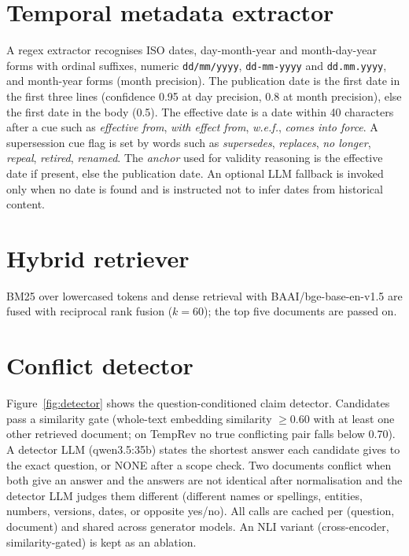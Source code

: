 \documentclass[11pt,a4paper]{report}
\begin{document}
\section{Temporal metadata extractor}
A regex extractor recognises ISO dates, day-month-year and month-day-year forms with ordinal suffixes, numeric \texttt{dd/mm/yyyy}, \texttt{dd-mm-yyyy} and \texttt{dd.mm.yyyy}, and month-year forms (month precision). The publication date is the first date in the first three lines (confidence 0.95 at day precision, 0.8 at month precision), else the first date in the body (0.5). The effective date is a date within 40 characters after a cue such as \emph{effective from}, \emph{with effect from}, \emph{w.e.f.}, \emph{comes into force}. A supersession cue flag is set by words such as \emph{supersedes}, \emph{replaces}, \emph{no longer}, \emph{repeal}, \emph{retired}, \emph{renamed}. The \emph{anchor} used for validity reasoning is the effective date if present, else the publication date. An optional LLM fallback is invoked only when no date is found and is instructed not to infer dates from historical content.

\section{Hybrid retriever}
BM25 over lowercased tokens and dense retrieval with BAAI/bge-base-en-v1.5 are fused with reciprocal rank fusion ($k=60$); the top five documents are passed on.

\section{Conflict detector}
Figure~\ref{fig:detector} shows the question-conditioned claim detector. Candidates pass a similarity gate (whole-text embedding similarity $\ge 0.60$ with at least one other retrieved document; on TempRev no true conflicting pair falls below 0.70). A detector LLM (qwen3.5:35b) states the shortest answer each candidate gives to the exact question, or NONE after a scope check. Two documents conflict when both give an answer and the answers are not identical after normalisation and the detector LLM judges them different (different names or spellings, entities, numbers, versions, dates, or opposite yes/no). All calls are cached per (question, document) and shared across generator models. An NLI variant (cross-encoder, similarity-gated) is kept as an ablation.
\end{document}
